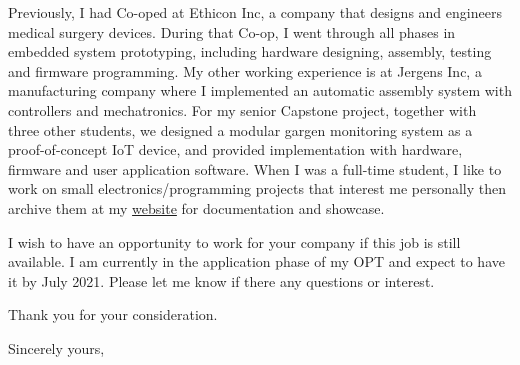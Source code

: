 \documentclass[11pt]{letter} %
\begin{document}
\begin{letter}
    \par Previously, I had Co-oped at Ethicon Inc, a company that designs and engineers medical surgery devices. During that Co-op, I went through all phases in embedded system prototyping, including hardware designing, assembly, testing and firmware programming.
    My other working experience is at Jergens Inc, a manufacturing company where I implemented an automatic assembly system with controllers and mechatronics.
    For my senior Capstone project, together with three other students, we designed a modular gargen monitoring system as a proof-of-concept IoT device, and provided implementation with hardware, firmware and user application software.
    When I was a full-time student, I like to work on small electronics/programming projects that interest me personally then archive them at my \href{https://liu2z2.github.io/}{website} for documentation and showcase.

    \par I wish to have an opportunity to work for your company if this job is still available.
    I am currently in the application phase of my OPT and expect to have it by July 2021.
    Please let me know if there any questions or interest.

    \par Thank you for your consideration.

    \closing{Sincerely yours,}




\end{letter}
\end{document}
